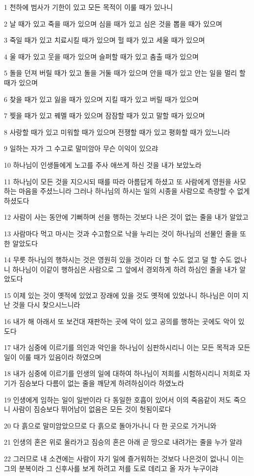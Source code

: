 \par 1 천하에 범사가 기한이 있고 모든 목적이 이룰 때가 있나니
\par 2 날 때가 있고 죽을 때가 있으며 심을 때가 있고 심은 것을 뽑을 때가 있으며
\par 3 죽일 때가 있고 치료시킬 때가 있으며 헐 때가 있고 세울 때가 있으며
\par 4 울 때가 있고 웃을 때가 있으며 슬퍼할 때가 있고 춤출 때가 있으며
\par 5 돌을 던져 버릴 때가 있고 돌을 거둘 때가 있으며 안을 때가 있고 안는 일을 멀리 할 때가 있으며
\par 6 찾을 때가 있고 잃을 때가 있으며 지킬 때가 있고 버릴 때가 있으며
\par 7 찢을 때가 있고 꿰멜 때가 있으며 잠잠할 때가 있고 말할 때가 있으며
\par 8 사랑할 때가 있고 미워할 때가 있으며 전쟁할 때가 있고 평화할 때가 있느니라
\par 9 일하는 자가 그 수고로 말미암아 무슨 이익이 있으랴
\par 10 하나님이 인생들에게 노고를 주사 애쓰게 하신 것을 내가 보았노라
\par 11 하나님이 모든 것을 지으시되 때를 따라 아름답게 하셨고 또 사람에게 영원을 사모하는 마음을 주셨느니라 그러나 하나님의 하시는 일의 시종을 사람으로 측량할 수 없게 하셨도다
\par 12 사람이 사는 동안에 기뻐하며 선을 행하는 것보다 나은 것이 없는 줄을 내가 알았고
\par 13 사람마다 먹고 마시는 것과 수고함으로 낙을 누리는 것이 하나님의 선물인 줄을 또한 알았도다
\par 14 무릇 하나님의 행하시는 것은 영원히 있을 것이라 더 할 수도 없고 덜 할 수도 없나니 하나님이 이같이 행하심은 사람으로 그 앞에서 경외하게 하려 하심인 줄을 내가 알았도다
\par 15 이제 있는 것이 옛적에 있었고 장래에 있을 것도 옛적에 있었나니 하나님은 이미 지난 것을 다시 찾으시느니라
\par 16 내가 해 아래서 또 보건대 재판하는 곳에 악이 있고 공의를 행하는 곳에도 악이 있도다
\par 17 내가 심중에 이르기를 의인과 악인을 하나님이 심판하시리니 이는 모든 목적과 모든 일이 이룰 때가 있음이라 하였으며
\par 18 내가 심중에 이르기를 인생의 일에 대하여 하나님이 저희를 시험하시리니 저희로 자기가 짐승보다 다름이 없는 줄을 깨닫게 하려하심이라 하였노라
\par 19 인생에게 임하는 일이 일반이라 다 동일한 호흡이 있어서 이의 죽음같이 저도 죽으니 사람이 짐승보다 뛰어남이 없음은 모든 것이 헛됨이로다
\par 20 다 흙으로 말미암았으므로 다 흙으로 돌아가나니 다 한 곳으로 가거니와
\par 21 인생의 혼은 위로 올라가고 짐승의 혼은 아래 곧 땅으로 내려가는 줄을 누가 알랴
\par 22 그러므로 내 소견에는 사람이 자기 일에 즐거워하는 것보다 나은것이 없나니 이는 그의 분복이라 그 신후사를 보게 하려고 저를 도로 데리고 올 자가 누구이랴

